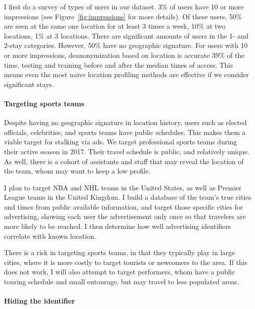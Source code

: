 I first do a survey of types of users in our dataset. 3\% of users have 10 or more impressions (see Figure~\ref{fig:impressions} for more details). Of these users, 50\% are seen at the same one location for at least 3 times a week, 10\% at two locations, 1\% at 3 locations. There are significant amounts of users in the 1- and 2-stay categories. However, 50\% have no geographic signature.
For users with 10 or more impressions, deanonymization based on location is accurate 39\% of the time, testing and training before and after the median times of access. This means even the most naive location profiling methods are effective if we consider significant stays.


\paragraph*{Targeting sports teams}

Despite having no geographic signature in location history, users such as elected officials, celebrities, and sports teams have public schedules. This makes them a viable target for stalking via ads. We target professional sports teams during their active season in 2017. Their travel schedule is public, and relatively unique. As well, there is a cohort of assistants and staff that may reveal the location of the team, whom may want to keep a low profile.

I plan to target NBA and NHL teams in the United States, as well as Premier League teams in the United Kingdom. I build a database of the team's true cities and times from public available information, and target those specific cities for advertising, showing each user the advertisement only once so that travelers are more likely to be reached. I then determine how well advertising identifiers correlate with known location.

There is a risk in targeting sports teams, in that they typically play in large cities, where it is more costly to target tourists or newcomers to the area. If this does not work, I will also attempt to target performers, whom have a public touring schedule and small entourage, but may travel to less populated areas.

\paragraph*{Hiding the identifier}

